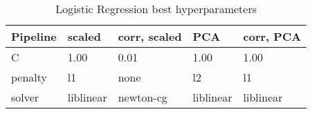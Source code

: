 \begin{table}[!htb]
\centering
\begin{tabular}{lllll}
\toprule
Pipeline & scaled & corr, scaled & PCA & corr, PCA \\
\midrule
C & 1.00 & 0.01 & 1.00 & 1.00 \\
penalty & l1 & none & l2 & l1 \\
solver & liblinear & newton-cg & liblinear & liblinear \\
\bottomrule
\end{tabular}
\caption{Logistic Regression best hyperparameters}
\label{table-logistic-regression-params}
\end{table}
